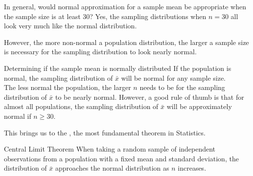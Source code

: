 \begin{examplewrap}
\begin{nexample}{In general, would normal approximation for a sample mean be appropriate when the sample size is at least 30?}
Yes, the sampling distributions when $n = 30$ all look very much like the normal distribution.

However, the more non-normal a population distribution, the larger a sample size is necessary for the sampling distribution to look nearly normal.
\end{nexample}
\end{examplewrap}

\begin{onebox}{Determining if the sample mean is normally distributed}
If the population is normal, the sampling distribution of $\bar{x}$ will be normal for any sample size. \\[2mm]
The less normal the population, the larger $n$ needs to be for the sampling distribution of $\bar{x}$ to be nearly normal. However, a good rule of thumb is that for almost all populations, the sampling distribution of $\bar{x}$ will be approximately normal if $n \ge 30$.\end{onebox}

This brings us to the , the most fundamental theorem in Statistics.

\begin{onebox}{Central Limit Theorem}
When taking a random sample of independent observations from a population with a fixed mean and standard deviation, the distribution of $\bar{x}$ approaches the normal distribution as $n$ increases.\end{onebox}

